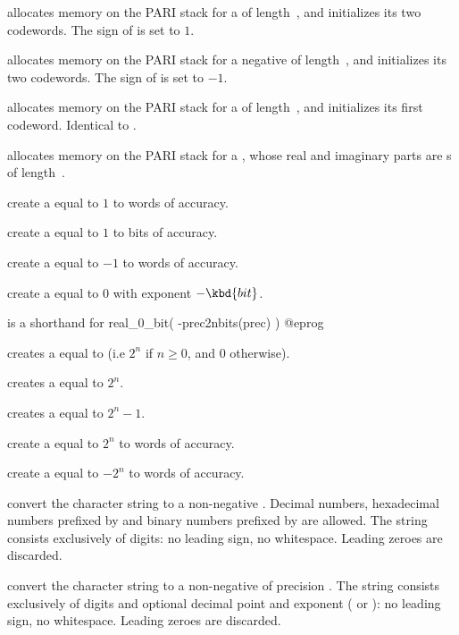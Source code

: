  allocates memory on the PARI stack for a
 of length~, and initializes its two codewords. The sign
of  is set to $1$.

 allocates memory on the PARI stack for a negative
 of length~, and initializes its two codewords. The sign
of  is set to $-1$.

 allocates memory on the PARI stack for a 
of length~, and initializes its first codeword. Identical to
.

 allocates memory on the PARI stack for a
, whose real and imaginary parts are s
of length~.

 create a  equal to $1$ to 
words of accuracy.

 create a  equal to $1$ to
 bits of accuracy.

 create a  equal to $-1$ to 
words of accuracy.

 create a  equal to $0$ with
exponent $-\kbd{bit}$.

 is a shorthand for
\bprog
  real_0_bit( -prec2nbits(prec) )
@eprog

 creates a  equal to  (i.e
$2^n$ if $n \geq 0$, and $0$ otherwise).

 creates a  equal to $2^n$.

 creates a  equal to $2^n - 1$.

 create a  equal to $2^n$
to  words of accuracy.

 create a  equal to $-2^n$
to  words of accuracy.

 convert the character string  to a
non-negative .
Decimal numbers, hexadecimal numbers prefixed by  and binary numbers prefixed
by  are allowed.  The string  consists exclusively of digits:
no leading sign, no whitespace. Leading zeroes are discarded.

 convert the character string  to
a non-negative  of precision . The string 
consists exclusively of digits and optional decimal point and exponent
( or ): no leading sign, no whitespace. Leading zeroes are
discarded.


